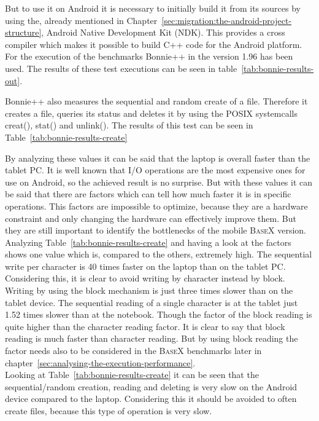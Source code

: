 But to use it on Android it is necessary to initially build it from its sources by using the, already mentioned in Chapter~\ref{sec:migration:the-android-project-structure}, Android Native Development Kit (NDK).
This provides a cross compiler which makes it possible to build C++ code for the Android platform.
For the execution of the benchmarks Bonnie++ in the version 1.96 has been used.
The results of these test executions can be seen in table~\ref{tab:bonnie-results-out}.

Bonnie++ also measures the sequential and random create of a file.
Therefore it creates a file, queries its status and deletes it by using the POSIX systemcalls \textsf{creat()}, \textsf{stat()} and \textsf{unlink()}.
The results of this test can be seen in Table~\ref{tab:bonnie-results-create}

By analyzing these values it can be said that the laptop is overall faster than the tablet PC.
It is well known that I/O operations are the most expensive ones for use on Android, so the achieved result is no surprise. 
But with these values it can be said that there are factors which can tell how much faster it is in specific operations.
This factors are impossible to optimize, because they are a hardware constraint and only changing the hardware can effectively improve them.
But they are still important to identify the bottlenecks of the mobile \textsc{BaseX} version.\\
Analyzing Table~\ref{tab:bonnie-results-create} and having a look at the factors shows one value which is, compared to the others, extremely high.
The sequential write per character is 40 times faster on the laptop than on the tablet PC.
Considering this, it is clear to avoid writing by character instead by block.
Writing by using the block mechanism is just three times slower than on the tablet device.
The sequential reading of a single character is at the tablet just 1.52 times slower than at the notebook.
Though the factor of the block reading is quite higher than the character reading factor.
It is clear to say that block reading is much faster than character reading.
But by using block reading the factor needs also to be considered in the \textsc{BaseX} benchmarks later in chapter~\ref{sec:analysing-the-execution-performance}.
\\
Looking at Table~\ref{tab:bonnie-results-create} it can be seen that the sequential/random creation, reading and deleting is very slow on the Android device compared to the laptop.
Considering this it should be avoided to often create files, because this type of operation is very slow.\\
